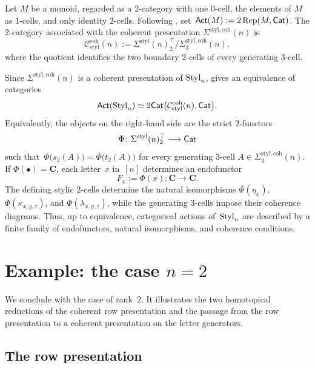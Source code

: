 \documentclass[a4paper, twoside, 11pt, english]{article}
\begin{document}
Let $M$ be a monoid, regarded as a $2$-category with one $0$-cell,
the elements of $M$ as $1$-cells, and only identity $2$-cells. Following
\cite[Subsection~5.1]{GaussentGuiraudMalbos15}, set~$\mathbf{\mathsf{Act}}(M):=2\operatorname{Rep}(M,\mathbf{\mathsf{Cat}})$.
The $2$-category associated with the coherent presentation
$\Sigma^{\mathrm{styl,coh}}(n)$ is
\[
\mathcal C_{\mathrm{styl}}^{\mathrm{coh}}(n)
:=
\Sigma^{\mathrm{styl}}(n)_2^\top
\big/
\Sigma^{\mathrm{styl,coh}}_3(n),
\]
where the quotient identifies the two boundary $2$-cells of every
generating $3$-cell.

Since $\Sigma^{\mathrm{styl,coh}}(n)$ is a coherent presentation of
$\mathrm{Styl}_n$, \cite[Theorem~5.1.6]{GaussentGuiraudMalbos15} gives an
equivalence of categories
\[
\mathbf{\mathsf{Act}}(\mathrm{Styl}_n)
\simeq
2\mathbf{\mathsf{Cat}}\bigl(
\mathcal C_{\mathrm{styl}}^{\mathrm{coh}}(n),
\mathbf{\mathsf{Cat}}
\bigr).
\]
Equivalently, the objects on the right-hand side are the strict $2$-functors
\[
\Phi\colon
\Sigma^{\mathrm{styl}}(n)_2^\top
\longrightarrow
\mathbf{\mathsf{Cat}}
\]
such that~$
\Phi\bigl(s_2(A)\bigr)
=
\Phi\bigl(t_2(A)\bigr)$
for every generating $3$-cell
$A\in\Sigma^{\mathrm{styl,coh}}_3(n)$.
If $\Phi(\bullet)=\mathbf C$, each letter~$x$ in~$[n]$ determines an
endofunctor
\[
F_x:=\Phi(x)\colon
\mathbf C\longrightarrow\mathbf C.
\]
The defining stylic $2$-cells determine the natural isomorphisms
$\Phi(\eta_x)$, $\Phi(\kappa_{x,y,z})$, and
$\Phi(\lambda_{x,y,z})$, while the generating $3$-cells impose their
coherence diagrams. Thus, up to equivalence, categorical
actions of~$\mathrm{Styl}_n$ are described by a finite family of endofunctors,
natural isomorphisms, and coherence conditions.





\section[Example: the case n=2]
{Example: the case \texorpdfstring{$n=2$}{n=2}}
\label{S:Example}

We conclude with the case of rank~$2$. It illustrates the two
homotopical reductions of the coherent row presentation and the passage
from the row presentation to a coherent presentation on the letter
generators.

\subsection{The row presentation}
\end{document}
